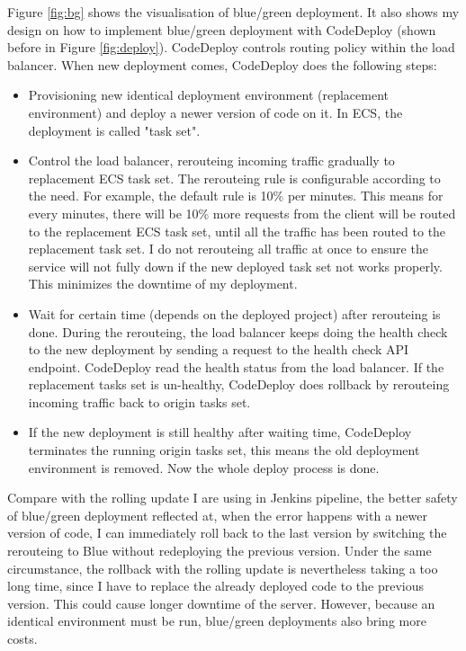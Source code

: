 \par
Figure \ref{fig:bg} shows the visualisation of blue/green deployment. It also shows my design on how to implement blue/green deployment with CodeDeploy (shown before in Figure \ref{fig:deploy}). CodeDeploy controls routing policy within the load balancer. When new deployment comes, CodeDeploy does the following steps:
\begin{itemize}
 \item Provisioning new identical deployment environment (replacement environment) and deploy a newer version of code on it. In ECS, the deployment is called "task set".
 \item Control the load balancer, rerouteing incoming traffic gradually to replacement ECS task set. The rerouteing rule is configurable according to the need. For example, the default rule is 10\% per minutes. This means for every minutes, there will be 10\% more requests from the client will be routed to the replacement ECS task set, until all the traffic has been routed to the replacement task set. I do not rerouteing all traffic at once to ensure the service will not fully down if the new deployed task set not works properly. This minimizes the downtime of my deployment.
 \item Wait for certain time (depends on the deployed project) after rerouteing is done. During the rerouteing, the load balancer keeps doing the health check to the new deployment by sending a request to the health check API endpoint. CodeDeploy read the health status from the load balancer. If the replacement tasks set is un-healthy, CodeDeploy does rollback by rerouteing incoming traffic back to origin tasks set.
 \item If the new deployment is still healthy after waiting time, CodeDeploy terminates the running origin tasks set, this means the old deployment environment is removed. Now the whole deploy process is done.
\end{itemize}
Compare with the rolling update I are using in Jenkins pipeline, the better safety of blue/green deployment reflected at, when the error happens with a newer version of code, I can immediately roll back to the last version by switching the rerouteing to Blue \cite{UsingBlu65:online} without redeploying the previous version. Under the same circumstance, the rollback with the rolling update is nevertheless taking a too long time, since I have to replace the already deployed code to the previous version. This could cause longer downtime of the server. However, because an identical environment must be run, blue/green deployments also bring more costs.
